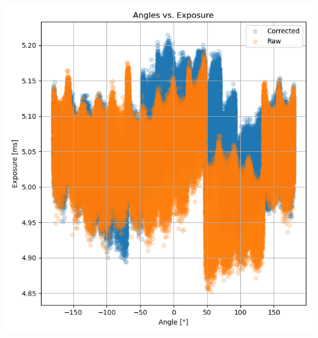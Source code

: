 \noindent\begin{minipage}[t]{\dimexpr.994\linewidth/3}\vspace{0pt}
    \begin{centering}
        \includegraphics[width=\linewidth]{../results/59-99fps-4999us-at-60-299084fps-vs-both}
        \vspace{-2.0em}
        \label{img:vs}
    \end{centering}
\end{minipage}


